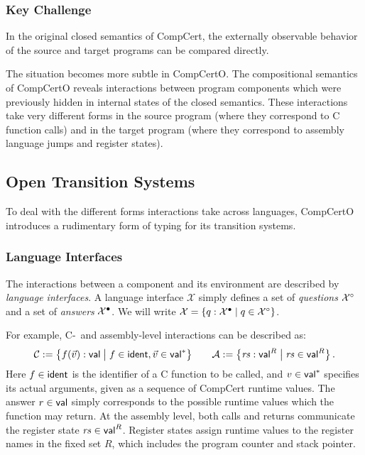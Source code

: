 \documentclass[acmsmall,review,anonymous]{acmart}\settopmatter{printfolios=true,printccs=false,printacmref=false}
\begin{document}

\subsubsection{Key Challenge} \label{sec:compcerto-challenge} %

In the original closed semantics of CompCert,
the externally observable behavior
of the source and target programs
can be compared directly.

The situation becomes more subtle in CompCertO.
The compositional semantics of CompCertO
reveals interactions between program components
which were previously hidden in internal states
of the closed semantics.
These interactions take very different forms
in the source program
(where they correspond to C function calls)
and in the target program
(where they correspond to assembly language jumps
and register states).



\subsection{Open Transition Systems} %

To deal with the different forms
interactions take
across languages,
CompCertO introduces a rudimentary form of typing
for its transition systems.

\subsubsection{Language Interfaces} %

The interactions between a component and its environment
are described by \emph{language interfaces}.
A language interface $\mathcal{X}$ simply defines
a set of \emph{questions} $\mathcal{X}^\circ$ and
a set of \emph{answers} $\mathcal{X}^\bullet$.
We will write
$\mathcal{X} = \{ q : \mathcal{X}^\bullet \mid q \in \mathcal{X}^\circ \}$.

For example, C-~and assembly-level interactions
can be described as:
\[
  \mathcal{C} :=
    \big\{ f(\vec{v}) :  \mathsf{val}  \mathrel{\big|}
       f \in  \mathsf{ident} , \vec{v} \in  \mathsf{val} ^* \big\}
  \qquad
  \mathcal{A} :=
    \big\{ \mathit{rs} :  \mathsf{val} ^R \mathrel{\big|}
       \mathit{rs} \in  \mathsf{val} ^R \big\}
  \,.
\]
Here $f \in  \mathsf{ident} $ is the identifier of
a C function to be called,
and $v \in  \mathsf{val} ^*$ specifies its actual arguments,
given as a sequence of CompCert runtime values.
The answer $r \in  \mathsf{val} $ simply corresponds to
the possible runtime values which the function may return.
At the assembly level,
both calls and returns communicate
the register state $\mathit{rs} \in  \mathsf{val} ^R$.
Register states assign runtime values
to the register names in the fixed set $R$,
which includes the program counter and stack pointer.
\end{document}
